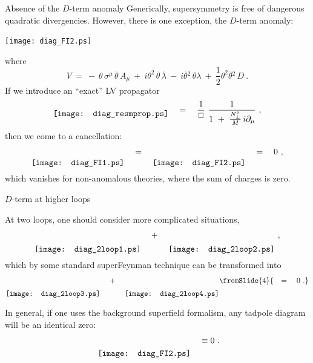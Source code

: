 \documentclass[pdf,PItalk,slideColor,colorBG,accumulate]{prosper}
\newcommand{\myit}{\usefont{T1}{ppl}{m}{it}\fontsize{8pt}{6pt}\selectfont}
\begin{document}
{
\begin{slide}[Replace]{ Absence of the $D$-term anomaly }
\vspace{-0.5cm}
	Generically, supersymmetry is free of dangerous quadratic
	divergencies.
	However, there is one exception, the $ D $-term anomaly:

\begin{center}
	\texttt{[image: diag\_FI2.ps]}
\end{center}
	where
\[
        V ~=~  -~ \theta\,\sigma^\mu\, \overline{\theta}\, A_\mu ~+~
                i \theta^2\, \overline{\theta}\, \overline{\lambda} 
                ~-~
                i \overline{\theta}{}^2\, \theta\lambda
                ~+~
                \frac{1}{2}
                \theta^2\overline{\theta}{}^2\, D~.
\]
	If we introduce an ``exact'' LV propagator	
%
\[
\raisebox{-1ex}{\texttt{[image: diag\_resmprop.ps]}}
\quad = \quad 
\frac 1{\Box}~  \frac 1{1 ~+~  \frac{ N_\pm^\mu} M \, i\partial_\mu}~, 
\]
%
	then we come to a cancellation:
%
\[
\raisebox{-3.0ex}{\texttt{[image: diag\_FI1.ps]}}
\quad = \quad 
\raisebox{-3.0ex}{\texttt{[image: diag\_FI2.ps]}}
\quad = \quad 0~,
\]
	which vanishes for non-anomalous theories, where the sum of 
	charges is zero.
%

\end{slide}
}


{
\begin{slide}[Replace]{ $ D $-term at higher loops }

	At two loops, one should consider more complicated situations,
%
\[
\raisebox{-3.8ex}{\texttt{[image: diag\_2loop1.ps]}}
\quad + \quad 
\raisebox{-3.8ex}{\texttt{[image: diag\_2loop2.ps]}}
~,
\]
%
	which by some standard superFeynman technique can be transformed
	into
%
\[
\raisebox{-4.0ex}{\texttt{[image: diag\_2loop3.ps]}}
\quad + \quad 
\raisebox{-4.0ex}{\texttt{[image: diag\_2loop4.ps]}}
\fromSlide{4}{
	\quad = \quad 0~.
	}
\]

%
	In general, if one uses the {\myit background superfield
	formalism}, any tadpole diagram will be an identical zero:
\[
	\raisebox{-3.5ex}{
	\texttt{[image: diag\_FI2.ps]}}
	\quad \equiv 0 ~.
\]

\end{slide}
}
\end{document}
